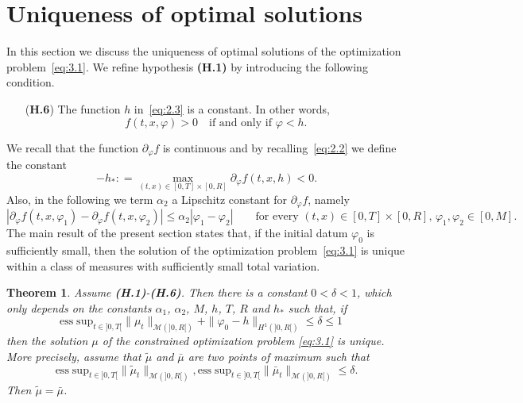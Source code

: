 \documentclass[11pt,leqno]{amsart}
\newtheorem{theorem}{Theorem}[section]
\numberwithin{equation}{section}
\begin{document}
\section{Uniqueness of optimal solutions}
\label{sec:6}
In this section we discuss the uniqueness of optimal solutions of the optimization problem~\eqref{eq:3.1}. 
We refine hypothesis {\bf (H.1)} by introducing the following condition. 
\begin{itemize}
\item[({\bf H.6})]
\label{h:accasei}
The function $h$ in~\eqref{eq:2.3} is a constant. In other words, 
\begin{equation}
\label{eq:2.3bis}
    f(t, x, {\varphi} ) >0 \quad \text{if and only if ${\varphi} <h$}.
\end{equation}
\end{itemize}
We recall that the  function $\partial_{\varphi} f$ is continuous and by recalling~\eqref{eq:2.2} we define the constant
 \begin{equation}
 \label{e:accastar}
- h_*: = \max_{(t, x) \in [0, T ] \times [0, R]}
{\partial}_{\varphi} f(t, x, h) < 0. 
\end{equation}
Also, in the following we term $\alpha_2$ a Lipschitz constant for 
${\partial}_{\varphi} f$, namely
\begin{equation}
\label{e:alpha2}
   |{\partial}_{\varphi} f (t,x,{\varphi}_1) -{\partial}_{\varphi} f(t,x,{\varphi}_2)|
   \leq \alpha_2 |{\varphi}_1-{\varphi}_2| \qquad
   \text{for every $(t, x) \in[0, T] \times [0, R]$, 
   ${\varphi}_1, {\varphi}_2 \in [0, M]$.}
\end{equation}
The main result of the present section states that, if the initial datum ${\varphi}_0$ is sufficiently small, then the solution of the optimization problem~\eqref{eq:3.1} is unique within a class of measures with sufficiently small total variation. 
\begin{theorem}
  \label{th:main3}
  Assume {\bf (H.1)}-{\bf (H.6)}. Then there is a constant $0<\delta<1$,
  which only depends on the constants $\alpha_1$, $\alpha_2$, $M$,
  $h$, $T$, $R$ and $h_\ast$ such that, if
  \begin{equation}
    \label{eq:initass}\mathrm{ess \; sup}_{t \in ]0, T[} 
    \|  \mu_t \|_{\mathcal M (]0, R[)} +
    \| {\varphi}_0 - h \|_{H^1 (]0, R[)} \le \delta \leq 1 \quad 
  \end{equation}
  then the solution $ \mu$ of the constrained optimization problem \eqref{eq:3.1} is unique. More precisely, assume 
  that $\tilde \mu$ and $\bar \mu$ are two points of maximum such that 
  \begin{equation}
    \label{e:muastast}
    \mathrm{ess \; sup}_{t \in ]0, T[}   
    \| \tilde \mu_t \|_{\mathcal M(]0, R[)}, 
    \mathrm{ess \; sup}_{t \in ]0, T[}   
    \| \bar \mu_t \|_{\mathcal M(]0, R[)}  \leq \delta. 
  \end{equation}
  Then $\tilde \mu = \bar \mu$.
\end{theorem}
\end{document}
